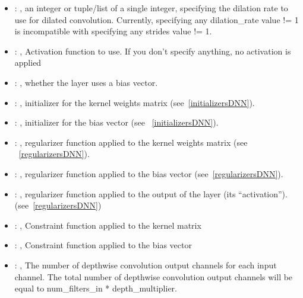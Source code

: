 \begin{itemize}
\begin{itemize}
        \item {}: , 
          an integer or tuple/list of a single integer, specifying the dilation rate to use for
          dilated         convolution. Currently, specifying any dilation\_rate value != 1 is
          incompatible with specifying any         strides value != 1.

        \item {}: , 
          Activation function to use. If you don't specify anything, no activation is applied

        \item {}: , 
          whether the layer uses a bias vector.

        \item {}: , 
          initializer for the kernel weights matrix (see~\ref{initializersDNN}).

        \item {}: , 
          initializer for the bias vector (see ~\ref{initializersDNN}).

        \item {}: , 
          regularizer function applied to the kernel weights matrix (see ~\ref{regularizersDNN}).

        \item {}: , 
          regularizer function applied to the bias vector (see~\ref{regularizersDNN}).

        \item {}: , 
          regularizer function applied to the output         of the layer (its ``activation'').
          (see~\ref{regularizersDNN})

        \item {}: , 
          Constraint function applied to the kernel matrix

        \item {}: , 
          Constraint function applied to the bias vector

        \item {}: , 
          The number of depthwise convolution output channels for each input channel. The total
          number of         depthwise convolution output channels will be equal to num\_filters\_in *
          depth\_multiplier.


\end{itemize}
\end{itemize}
